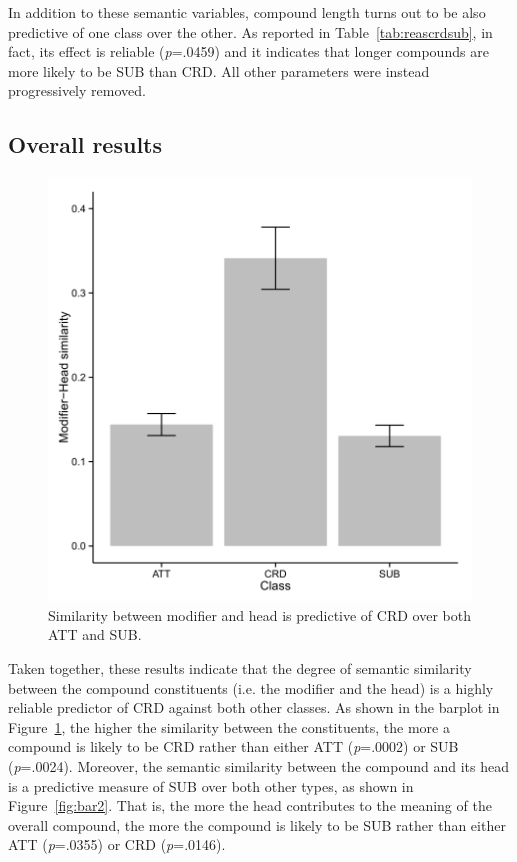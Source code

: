 In addition to these semantic variables, compound length turns out to be also predictive of one class over the other. As reported in Table~\ref{tab:reascrdsub}, in fact, its effect is reliable (\emph{p}=.0459) and it indicates that longer compounds are more likely to be SUB than CRD. All other parameters were instead progressively removed.

\subsection{Overall results}

\begin{figure}[t!]
\begin{center}
\includegraphics[scale=0.9]{figures/barplot1.png}
\caption{Similarity between modifier and head is predictive of CRD over both ATT and SUB.}\label{fig:bar1}
\end{center}
\end{figure}


Taken together, these results indicate that the degree of semantic similarity between the compound constituents (i.e. the modifier and the head) is a highly reliable predictor of CRD against both other classes. As shown in the barplot in Figure~\ref{fig:bar1}, the higher the similarity between the constituents, the more a compound is likely to be CRD rather than either ATT (\emph{p}=.0002) or SUB (\emph{p}=.0024). Moreover, the semantic similarity between the compound and its head is a predictive measure of SUB over both other types, as shown in Figure~\ref{fig:bar2}. That is, the more the head contributes to the meaning of the overall compound, the more the compound is likely to be SUB rather than either ATT (\emph{p}=.0355) or CRD (\emph{p}=.0146).

